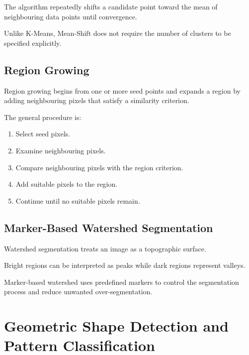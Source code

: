 \documentclass[11pt,a4paper]{article}
\begin{document}
The algorithm repeatedly shifts a candidate point toward the mean of neighbouring data points until convergence.

Unlike K-Means, Mean-Shift does not require the number of clusters to be specified explicitly.


\subsection{Region Growing}

Region growing begins from one or more seed points and expands a region by adding neighbouring pixels that satisfy a similarity criterion.

The general procedure is:

\begin{enumerate}
    \item Select seed pixels.
    \item Examine neighbouring pixels.
    \item Compare neighbouring pixels with the region criterion.
    \item Add suitable pixels to the region.
    \item Continue until no suitable pixels remain.
\end{enumerate}


\subsection{Marker-Based Watershed Segmentation}

Watershed segmentation treats an image as a topographic surface.

Bright regions can be interpreted as peaks while dark regions represent valleys.

Marker-based watershed uses predefined markers to control the segmentation process and reduce unwanted over-segmentation.


\section{Geometric Shape Detection and Pattern Classification}
\end{document}
